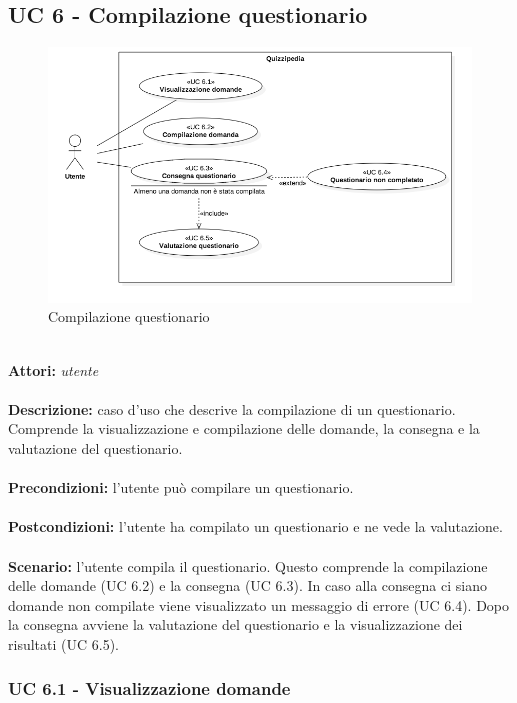 \documentclass[a4paper,11pt]{article}
\begin{document}
\subsection{UC 6 - Compilazione questionario}

\begin{figure}[h!]
\centering
\includegraphics[scale=0.6]{../immagini/UC6.png}
\caption{Compilazione questionario}
\end{figure}
\ \\
\textbf{Attori:} \textit{utente}
\\ \\
\textbf{Descrizione:} caso d'uso che descrive la compilazione di un questionario. Comprende la visualizzazione e compilazione delle domande, la consegna e la valutazione del questionario.\\
\\
\textbf{Precondizioni:} l'utente può compilare un questionario.\\
\\
\textbf{Postcondizioni:} l’utente ha compilato un questionario e ne vede la valutazione.\\
\\
\textbf{Scenario:} l’utente compila il questionario. Questo comprende la compilazione delle domande (UC 6.2) e la consegna (UC 6.3). In caso alla consegna ci siano domande non compilate viene visualizzato un messaggio di errore (UC 6.4). Dopo la consegna avviene la valutazione del questionario e la visualizzazione dei risultati (UC 6.5).\\


\subsubsection{UC 6.1 - Visualizzazione domande}
\end{document}
